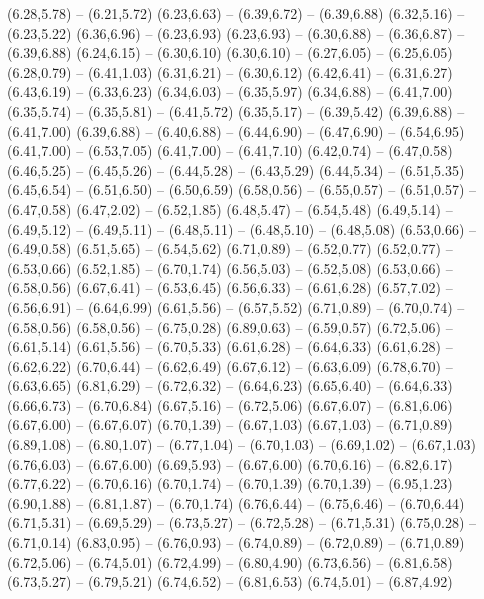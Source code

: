 {  (6.28,5.78) -- (6.21,5.72)
  (6.23,6.63) -- (6.39,6.72) -- (6.39,6.88)
  (6.32,5.16) -- (6.23,5.22)
  (6.36,6.96) -- (6.23,6.93)
  (6.23,6.93) -- (6.30,6.88) -- (6.36,6.87) -- (6.39,6.88)
  (6.24,6.15) -- (6.30,6.10)
  (6.30,6.10) -- (6.27,6.05) -- (6.25,6.05)
  (6.28,0.79) -- (6.41,1.03)
  (6.31,6.21) -- (6.30,6.12)
  (6.42,6.41) -- (6.31,6.27)
  (6.43,6.19) -- (6.33,6.23)
  (6.34,6.03) -- (6.35,5.97)
  (6.34,6.88) -- (6.41,7.00)
  (6.35,5.74) -- (6.35,5.81) -- (6.41,5.72)
  (6.35,5.17) -- (6.39,5.42)
  (6.39,6.88) -- (6.41,7.00)
  (6.39,6.88) -- (6.40,6.88) -- (6.44,6.90) -- (6.47,6.90) -- (6.54,6.95)
  (6.41,7.00) -- (6.53,7.05)
  (6.41,7.00) -- (6.41,7.10)
  (6.42,0.74) -- (6.47,0.58)
  (6.46,5.25) -- (6.45,5.26) -- (6.44,5.28) -- (6.43,5.29)
  (6.44,5.34) -- (6.51,5.35)
  (6.45,6.54) -- (6.51,6.50) -- (6.50,6.59)
  (6.58,0.56) -- (6.55,0.57) -- (6.51,0.57) -- (6.47,0.58)
  (6.47,2.02) -- (6.52,1.85)
  (6.48,5.47) -- (6.54,5.48)
  (6.49,5.14) -- (6.49,5.12) -- (6.49,5.11) -- (6.48,5.11) -- (6.48,5.10) -- (6.48,5.08)
  (6.53,0.66) -- (6.49,0.58)
  (6.51,5.65) -- (6.54,5.62)
  (6.71,0.89) -- (6.52,0.77)
  (6.52,0.77) -- (6.53,0.66)
  (6.52,1.85) -- (6.70,1.74)
  (6.56,5.03) -- (6.52,5.08)
  (6.53,0.66) -- (6.58,0.56)
  (6.67,6.41) -- (6.53,6.45)
  (6.56,6.33) -- (6.61,6.28)
  (6.57,7.02) -- (6.56,6.91) -- (6.64,6.99)
  (6.61,5.56) -- (6.57,5.52)
  (6.71,0.89) -- (6.70,0.74) -- (6.58,0.56)
  (6.58,0.56) -- (6.75,0.28)
  (6.89,0.63) -- (6.59,0.57)
  (6.72,5.06) -- (6.61,5.14)
  (6.61,5.56) -- (6.70,5.33)
  (6.61,6.28) -- (6.64,6.33)
  (6.61,6.28) -- (6.62,6.22)
  (6.70,6.44) -- (6.62,6.49)
  (6.67,6.12) -- (6.63,6.09)
  (6.78,6.70) -- (6.63,6.65)
  (6.81,6.29) -- (6.72,6.32) -- (6.64,6.23)
  (6.65,6.40) -- (6.64,6.33)
  (6.66,6.73) -- (6.70,6.84)
  (6.67,5.16) -- (6.72,5.06)
  (6.67,6.07) -- (6.81,6.06)
  (6.67,6.00) -- (6.67,6.07)
  (6.70,1.39) -- (6.67,1.03)
  (6.67,1.03) -- (6.71,0.89)
  (6.89,1.08) -- (6.80,1.07) -- (6.77,1.04) -- (6.70,1.03) -- (6.69,1.02) -- (6.67,1.03)
  (6.76,6.03) -- (6.67,6.00)
  (6.69,5.93) -- (6.67,6.00)
  (6.70,6.16) -- (6.82,6.17)
  (6.77,6.22) -- (6.70,6.16)
  (6.70,1.74) -- (6.70,1.39)
  (6.70,1.39) -- (6.95,1.23)
  (6.90,1.88) -- (6.81,1.87) -- (6.70,1.74)
  (6.76,6.44) -- (6.75,6.46) -- (6.70,6.44)
  (6.71,5.31) -- (6.69,5.29) -- (6.73,5.27) -- (6.72,5.28) -- (6.71,5.31)
  (6.75,0.28) -- (6.71,0.14)
  (6.83,0.95) -- (6.76,0.93) -- (6.74,0.89) -- (6.72,0.89) -- (6.71,0.89)
  (6.72,5.06) -- (6.74,5.01)
  (6.72,4.99) -- (6.80,4.90)
  (6.73,6.56) -- (6.81,6.58)
  (6.73,5.27) -- (6.79,5.21)
  (6.74,6.52) -- (6.81,6.53)
  (6.74,5.01) -- (6.87,4.92)
}
